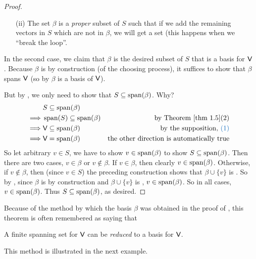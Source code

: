 \begin{proof}
\begin{enumerate}
\item [(ii)] The set \(\beta\) is a \emph{proper} \LID{} subset of \(S\) such that if we add the remaining vectors in \(S\) which are not in \(\beta\), we will get a \LDP{} set (this happens when we ``break the loop''.
\end{enumerate}
In the second case, we claim that \(\beta\) is the desired subset of \(S\) that is a basis for \(\textsf{V}\).
Because \(\beta\) is \LID{} by construction (of the choosing process), it suffices to show that \(\beta\) spans \(\textsf{V}\) (so by  \(\beta\) is a basis of \(\textsf{V}\)).

But by , we only need to show that \(S \subseteq \operatorname{span}(\beta)\).
Why?
\begin{align*}
             & S \subseteq \spann(\beta) \\
    \implies & \spann(S) \subseteq \spann(\beta) & \text{by \THM{1.5}}(2) \\
    \implies & \V \subseteq \spann(\beta) & \text{by the supposition, \BLUE{(1)}} \\
    \implies & \V = \spann(\beta) & \text{the other direction is automatically true}
\end{align*}
So let arbitrary \(v \in S\), we have to show \(v \in \operatorname{span}(\beta)\) to show \(S \subseteq \operatorname{span}(\beta)\).
Then there are two cases, \(v \in \beta\) or \(v \notin \beta\).
If \(v \in \beta\), then clearly \(v \in \operatorname{span}(\beta)\).
Otherwise, if \(v \notin \beta\), then (since \(v \in S\)) the preceding construction shows that \(\beta \cup \{ v \}\) is \LDP{}.
So by , since \(\beta\) is \LID{} by construction and \(\beta \cup \{ v \}\) is \LDP{}, \(v \in \operatorname{span}(\beta)\).
So in all cases, \(v \in \operatorname{span}(\beta)\).
Thus \(S \subseteq \operatorname{span}(\beta)\), as desired.
\end{proof}

\begin{remark} \label{remark 1.6.2}
Because of the method by which the basis \(\beta\) was obtained in the proof of , this theorem is often remembered as saying that
\begin{center}
    A finite spanning set for \(\textsf{V}\) can be \emph{reduced} to a basis for \(\textsf{V}\).
\end{center}
This method is illustrated in the next example.
\end{remark}

